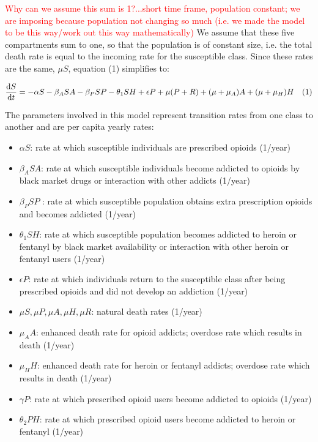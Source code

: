\documentclass[12pt]{article}
\begin{document}
\textcolor{red}{Why can we assume this sum is 1?...short time frame, population constant; we are imposing because population not changing so much (i.e. we made the model to be this way/work out this way mathematically)} We assume that these five compartments sum to one, so that the population is of constant size, i.e. the total death rate is equal to the incoming rate for the susceptible class.  Since these rates are the same, $\mu S$, equation (1) simplifies to: 

\[\dv{S}{t} = -\alpha S - \beta_{A} SA  -\beta_{P} SP- \theta_{1} SH +\epsilon P +\mu (P+R)+ (\mu + \mu_{A})A + (\mu+\mu_{H}) H \quad (1)\] 


The parameters involved in this model represent transition rates from one class to another and are per capita yearly rates:
\begin{itemize}
\item $\alpha S$: rate at which susceptible individuals are prescribed opioids (1/year)
\item $\beta_{A} SA$: rate at which susceptible individuals become addicted to opioids by black market drugs or interaction with other addicts (1/year)
\item $\beta_{P} SP$ : rate at which susceptible population obtains extra prescription opioids and becomes addicted  (1/year)
\item $\theta_1 SH$: rate at which susceptible population becomes addicted to heroin or fentanyl by black market availability or interaction with other heroin or fentanyl users  (1/year)
\item $\epsilon P$: rate at which individuals return to the susceptible class after being prescribed opioids and did not develop an addiction (1/year) 
\item $\mu S, \mu P, \mu A, \mu H, \mu R$: natural death rates (1/year)
\item $\mu_A A$: enhanced death rate for opioid addicts; overdose rate which results in death (1/year)
\item $\mu_H H$: enhanced death rate for heroin or fentanyl addicts; overdose rate which results in death (1/year)
\item $\gamma P$: rate at which prescribed opioid users become addicted to opioids (1/year)
\item $\theta_2 PH$: rate at which prescribed opioid users become addicted to heroin or fentanyl (1/year)

\end{itemize}
\end{document}
